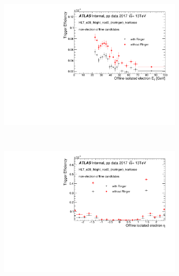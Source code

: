 \begin{figure}[h!tb]
\begin{center}
\begin{subfigure}[c]{.58\textwidth}
\centering
\includegraphics[width=\textwidth]{sections/04_operation/figures/efficiencies/eff_EGAM7_e28_ringer_and_noringer_2017_after_ts1_et.pdf}
\caption{}
\end{subfigure}\\
\begin{subfigure}[c]{.58\textwidth}
\centering
\includegraphics[width=\textwidth]{sections/04_operation/figures/efficiencies/eff_EGAM7_e28_ringer_and_noringer_2017_after_ts1_eta.pdf}
\caption{}
\end{subfigure} \\

\end{center}
\end{figure}
